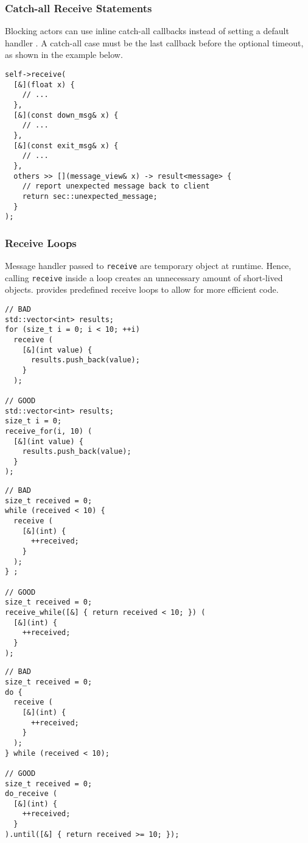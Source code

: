 \subsubsection{Catch-all Receive Statements}
\label{catch-all}

Blocking actors can use inline catch-all callbacks instead of setting a default
handler . A catch-all case must be the last callback
before the optional timeout, as shown in the example below.

\begin{lstlisting}
self->receive(
  [&](float x) {
    // ...
  },
  [&](const down_msg& x) {
    // ...
  },
  [&](const exit_msg& x) {
    // ...
  },
  others >> [](message_view& x) -> result<message> {
    // report unexpected message back to client
    return sec::unexpected_message;
  }
);
\end{lstlisting}

\clearpage
\subsubsection{Receive Loops}
\label{receive-loop}

Message handler passed to \lstinline^receive^ are temporary object at runtime.
Hence, calling \lstinline^receive^ inside a loop creates an unnecessary amount
of short-lived objects. \lib provides predefined receive loops to allow for
more efficient code.

\begin{lstlisting}
// BAD
std::vector<int> results;
for (size_t i = 0; i < 10; ++i)
  receive (
    [&](int value) {
      results.push_back(value);
    }
  );

// GOOD
std::vector<int> results;
size_t i = 0;
receive_for(i, 10) (
  [&](int value) {
    results.push_back(value);
  }
);
\end{lstlisting}

\begin{lstlisting}
// BAD
size_t received = 0;
while (received < 10) {
  receive (
    [&](int) {
      ++received;
    }
  );
} ;

// GOOD
size_t received = 0;
receive_while([&] { return received < 10; }) (
  [&](int) {
    ++received;
  }
);
\end{lstlisting}
\clearpage

\begin{lstlisting}
// BAD
size_t received = 0;
do {
  receive (
    [&](int) {
      ++received;
    }
  );
} while (received < 10);

// GOOD
size_t received = 0;
do_receive (
  [&](int) {
    ++received;
  }
).until([&] { return received >= 10; });
\end{lstlisting}

